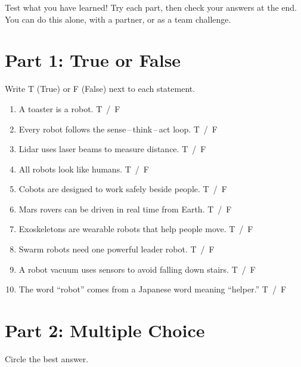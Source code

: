 

Test what you have learned! Try each part, then check your answers at the end.
You can do this alone, with a partner, or as a team challenge.

\sectionrule

\section*{Part 1: True or False}

Write T (True) or F (False) next to each statement.

\begin{enumerate}
  \item A toaster is a robot. \hfill T \,/\, F
  \item Every robot follows the sense\,--\,think\,--\,act loop. \hfill T \,/\, F
  \item Lidar uses laser beams to measure distance. \hfill T \,/\, F
  \item All robots look like humans. \hfill T \,/\, F
  \item Cobots are designed to work safely beside people. \hfill T \,/\, F
  \item Mars rovers can be driven in real time from Earth. \hfill T \,/\, F
  \item Exoskeletons are wearable robots that help people move. \hfill T \,/\, F
  \item Swarm robots need one powerful leader robot. \hfill T \,/\, F
  \item A robot vacuum uses sensors to avoid falling down stairs. \hfill T \,/\, F
  \item The word ``robot'' comes from a Japanese word meaning ``helper.'' \hfill T \,/\, F
\end{enumerate}

\sectionrule

\section*{Part 2: Multiple Choice}

Circle the best answer.

